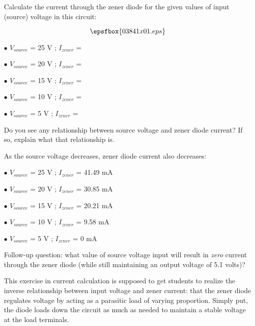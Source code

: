 

Calculate the current through the zener diode for the given values of input (source) voltage in this circuit:

$$\epsfbox{03841x01.eps}$$

\medskip
\item{$\bullet$} $V_{source}$ = 25 V ; $I_{zener}$ = 
\item{$\bullet$} $V_{source}$ = 20 V ; $I_{zener}$ = 
\item{$\bullet$} $V_{source}$ = 15 V ; $I_{zener}$ = 
\item{$\bullet$} $V_{source}$ = 10 V ; $I_{zener}$ = 
\item{$\bullet$} $V_{source}$ = 5 V ; $I_{zener}$ = 
\medskip

Do you see any relationship between source voltage and zener diode current?  If so, explain what that relationship is.







As the source voltage decreases, zener diode current also decreases:

\medskip
\item{$\bullet$} $V_{source}$ = 25 V ; $I_{zener}$ = 41.49 mA
\item{$\bullet$} $V_{source}$ = 20 V ; $I_{zener}$ = 30.85 mA
\item{$\bullet$} $V_{source}$ = 15 V ; $I_{zener}$ = 20.21 mA
\item{$\bullet$} $V_{source}$ = 10 V ; $I_{zener}$ = 9.58 mA
\item{$\bullet$} $V_{source}$ = 5 V ; $I_{zener}$ = 0 mA
\medskip

\vskip 10pt

Follow-up question: what value of source voltage input will result in {\it zero} current through the zener diode (while still maintaining an output voltage of 5.1 volts)?







This exercise in current calculation is supposed to get students to realize the inverse relationship between input voltage and zener current: that the zener diode regulates voltage by acting as a parasitic load of varying proportion.  Simply put, the diode loads down the circuit as much as needed to maintain a stable voltage at the load terminals.

